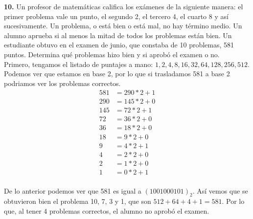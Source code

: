 \documentclass[12pt]{article}
\begin{document}
\vspace{1cm}

%
%
\textbf{10.} Un profesor de matemáticas califica los exámenes de la siguiente manera: el primer problema vale un
punto, el segundo 2, el tercero 4, el cuarto 8 y así sucesivamente. Un problema, o está bien o está mal, no hay
término medio. Un alumno aprueba si al menos la mitad de todos los problemas están bien. Un estudiante
obtuvo en el examen de junio, que constaba de 10 problemas, 581 puntos. Determina qué problemas hizo bien
y si aprobó el examen o no.\\

Primero, tengamos el listado de puntajes a mano: $1, 2, 4, 8, 16, 32, 64, 128, 256, 512$.\\

Podemos ver que estamos en base 2, por lo que si trasladamos 581 a base 2 podriamos ver los problemas correctos.
\begin{align*}
    581 &= 290 \ast 2 + 1\\
    290 &= 145 \ast 2 + 0\\
    145 &= 72 \ast 2 + 1\\
    72 &= 36 \ast 2 + 0\\
    36 &= 18 \ast 2 + 0\\
    18 &= 9 \ast 2 + 0\\
    9 &= 4 \ast 2 + 1\\
    4 &= 2 \ast 2 + 0\\
    2 &= 1 \ast 2 + 0\\
    1 &= 0 \ast 2 + 1\\
\end{align*}

De lo anterior podemos ver que 581 es igual a $(1001000101)_2$. Así vemos que se obtuvieron bien el problema 10, 7, 3 y 1, que son 
$512 + 64 + 4 + 1 = 581$. Por lo que, al tener 4 problemas correctos, el alumno no aprobó el examen.
\end{document}

